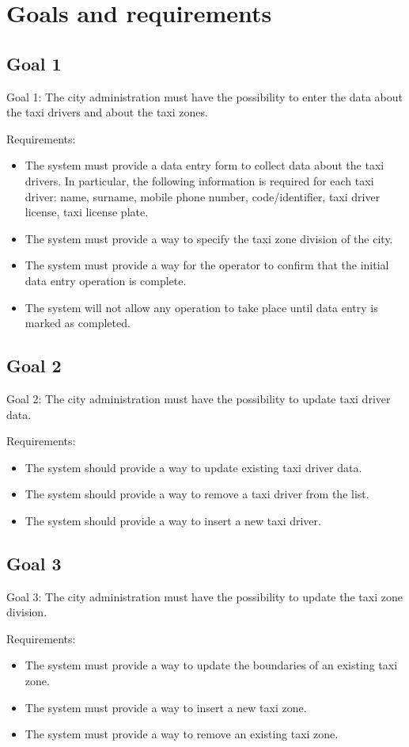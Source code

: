 
\section{Goals and requirements}
\subsection{Goal 1}
Goal 1: The city administration must have the possibility to enter the data about the taxi drivers and about the taxi zones. 

Requirements:
\begin{itemize}
\item The system must provide a data entry form to collect data about the taxi drivers. In particular, the following information is required for each taxi driver: name, surname, mobile phone number, code/identifier, taxi driver license, taxi license plate.
\item The system must provide a way to specify the taxi zone division of the city. 
\item The system must provide a way for the operator to confirm that the initial data entry operation is complete. 
\item The system will not allow any operation to take place until data entry is marked as completed. 
\end{itemize}

\subsection{Goal 2}
Goal 2: The city administration must have the possibility to update taxi driver data.

Requirements:
\begin{itemize}
\item The system should provide a way to update existing taxi driver data. 
\item The system should provide a way to remove a taxi driver from the list.
\item The system should provide a way to insert a new taxi driver.
\end{itemize}

\subsection{Goal 3}
Goal 3: The city administration must have the possibility to update the taxi zone division.

Requirements:
\begin{itemize}
\item The system must provide a way to update the boundaries of an existing taxi zone. 
\item The system must provide a way to insert a new taxi zone.
\item The system must provide a way to remove an existing taxi zone.
\end{itemize}

